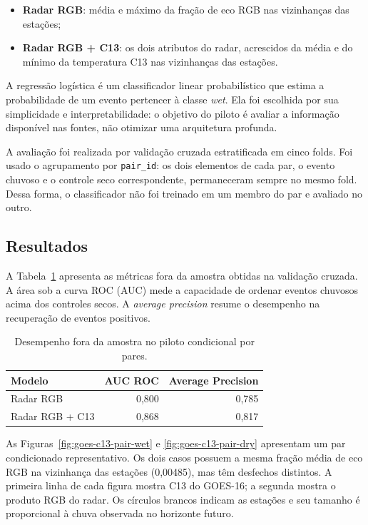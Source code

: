 \begin{itemize}
    \item \textbf{Radar RGB}: média e máximo da fração de eco RGB nas vizinhanças das estações;
    \item \textbf{Radar RGB + C13}: os dois atributos do radar, acrescidos da média e do mínimo da temperatura C13 nas vizinhanças das estações.
\end{itemize}

A regressão logística é um classificador linear probabilístico que estima a probabilidade de um evento pertencer à classe \textit{wet}. Ela foi escolhida por sua simplicidade e interpretabilidade: o objetivo do piloto é avaliar a informação disponível nas fontes, não otimizar uma arquitetura profunda.

A avaliação foi realizada por validação cruzada estratificada em cinco folds. Foi usado o agrupamento por \texttt{pair\_id}: os dois elementos de cada par, o evento chuvoso e o controle seco correspondente, permaneceram sempre no mesmo fold. Dessa forma, o classificador não foi treinado em um membro do par e avaliado no outro.

\subsection{Resultados}
\label{subsec:resultados-piloto-c13}

A Tabela~\ref{tab:piloto-c13-condicional} apresenta as métricas fora da amostra obtidas na validação cruzada. A área sob a curva ROC (AUC) mede a capacidade de ordenar eventos chuvosos acima dos controles secos. A \emph{average precision} resume o desempenho na recuperação de eventos positivos.

\begin{table}[htbp]
\centering
\caption{Desempenho fora da amostra no piloto condicional por pares.}
\label{tab:piloto-c13-condicional}
\begin{tabular}{lrr}
\toprule
\textbf{Modelo} & \textbf{AUC ROC} & \textbf{Average Precision} \\
\midrule
Radar RGB & 0,800 & 0,785 \\
Radar RGB + C13 & 0,868 & 0,817 \\
\bottomrule
\end{tabular}
\end{table}

As Figuras~\ref{fig:goes-c13-pair-wet} e \ref{fig:goes-c13-pair-dry} apresentam um par condicionado representativo. Os dois casos possuem a mesma fração média de eco RGB na vizinhança das estações (0,00485), mas têm desfechos distintos. A primeira linha de cada figura mostra C13 do GOES-16; a segunda mostra o produto RGB do radar. Os círculos brancos indicam as estações e seu tamanho é proporcional à chuva observada no horizonte futuro.

